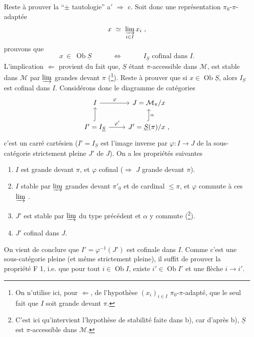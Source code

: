 \documentclass[11pt]{article}
\newcommand{\msp}[1]{\marginpar{\footnotesize [#1]}}
\newcommand{\uS}{\underline{S}}
\newcommand{\Ob}{\operatorname{Ob}}
\begin{document}
Reste à prouver la “$\pm$ tautologie” a$'$ $\Longrightarrow$ c. Soit donc une représentation $\pi_0$-$\pi$-adaptée
\[
x \ \simeq \ \varinjlim_{i\in I} x_i \ ,
\]
prouvons que
\[
x \ \in \ \Ob\uS \qquad\quad \Longleftrightarrow \qquad\quad I_{\uS} \text{ cofinal dans } I.
\]
L'implication $\Longleftarrow$ provient du fait que, $\uS$ étant $\pi$-accessible dans $\mathcal{M}$, est stable dans $\mathcal{M}$ par $\varinjlim$ grandes devant $\pi$ (\footnote[137]{On n'utilise ici, pour $\Longleftarrow$, de l'hypothèse $(x_i)_{i\in I}$ $\pi_0$-$\pi$-adapté, que le seul fait que $I$ soit grande devant $\pi$.}). Reste à prouver\msp{page 312} que si $x \in \Ob\uS$, alors $I_{\uS}$ est cofinal dans $I$. Considérons donc le diagramme de catégories
\[
\begin{tikzcd}
I \arrow[r, "\varphi"] & J = \mathcal{M}_\pi/x \\
I' = I_{\uS} \arrow[u, hook] \arrow[r, "\varphi'"] & J' = \uS(\pi)/x \ , \arrow[u, hook, "\alpha"']
\end{tikzcd}
\]
c'est un carré cartésien ($I' = I_{\uS}$ est l'image inverse par $\varphi : I \longrightarrow J$ de la sous-catégorie strictement pleine $J'$ de $J$). On a les propriétés suivantes
\begin{enumerate}
\item[1)] $I$ est grande devant $\pi$, et $\varphi$ cofinal ($\Longrightarrow$ $J$ grande devant $\pi$).
\item[2)] $I$ stable par $\varinjlim$ grandes devant $\pi'_0$ et de cardinal $\leqslant \pi$, et $\varphi$ commute à ces $\varinjlim$ .
\item[3)] $J'$ est stable par $\varinjlim$ du type précédent et $\alpha$ y commute (\footnote[138]{C'est ici qu'intervient l'hypothèse de stabilité faite dans b), car d'après b), $\uS$ est $\pi$-accessible dans $\mathcal{M}$.}).
\item[4)] $J'$ cofinal dans $J$.
\end{enumerate}
\noindent On vient de conclure que $I' = \varphi^{-1}(J')$\msp{page 313} est cofinale dans $I$. Comme c'est une sous-catégorie pleine (et même strictement pleine), il suffit de prouver la propriété F 1, i.e. que pour tout $i \in \Ob I$, existe $i' \in \Ob I'$ et une flèche $i \longrightarrow i'$.
\end{document}

